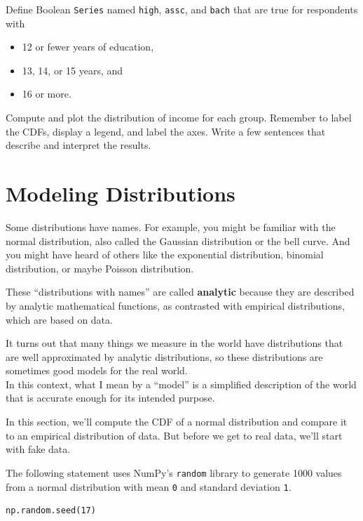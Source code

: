 Define Boolean \passthrough{\lstinline!Series!} named
\passthrough{\lstinline!high!}, \passthrough{\lstinline!assc!}, and
\passthrough{\lstinline!bach!} that are true for respondents with

\begin{itemize}
\item
  12 or fewer years of education,
\item
  13, 14, or 15 years, and
\item
  16 or more.
\end{itemize}

Compute and plot the distribution of income for each group. Remember to
label the CDFs, display a legend, and label the axes. Write a few
sentences that describe and interpret the results.

\hypertarget{modeling-distributions}{%
\section{Modeling Distributions}\label{modeling-distributions}}

Some distributions have names. For example, you might be familiar with
the normal distribution, also called the Gaussian distribution or the
bell curve. And you might have heard of others like the exponential
distribution, binomial distribution, or maybe Poisson distribution.

These ``distributions with names'' are called \textbf{analytic} because
they are described by analytic mathematical functions, as contrasted
with empirical distributions, which are based on data.

It turns out that many things we measure in the world have distributions
that are well approximated by analytic distributions, so these
distributions are sometimes good models for the real world.\\
In this context, what I mean by a ``model'' is a simplified description
of the world that is accurate enough for its intended purpose.

In this section, we'll compute the CDF of a normal distribution and
compare it to an empirical distribution of data. But before we get to
real data, we'll start with fake data.

The following statement uses NumPy's \passthrough{\lstinline!random!}
library to generate 1000 values from a normal distribution with mean
\passthrough{\lstinline!0!} and standard deviation
\passthrough{\lstinline!1!}.

\begin{lstlisting}[]
np.random.seed(17)
\end{lstlisting}

